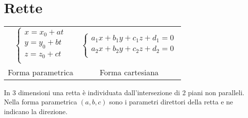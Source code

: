 \section{Rette}
\begin{tabular}{cc}
	$\begin{cases}
	x = x_0 + at \\[-0.3em]
	y = y_0 + bt \\[-0.3em]
	z = z_0 + ct \\
	\end{cases}$ &
	$\begin{cases}
		a_1x + b_1y + c_1z + d_1 = 0 \\[-0.3em]
		a_2x + b_2y + c_2z + d_2 = 0 \\
	\end{cases}$ \\
	Forma parametrica & Forma cartesiana \\
\end{tabular}

In 3 dimensioni una retta è individuata dall'intersezione di 2 piani non paralleli. Nella forma parametrica
$(a, b, c)$ sono i parametri direttori della retta e ne indicano la direzione.
